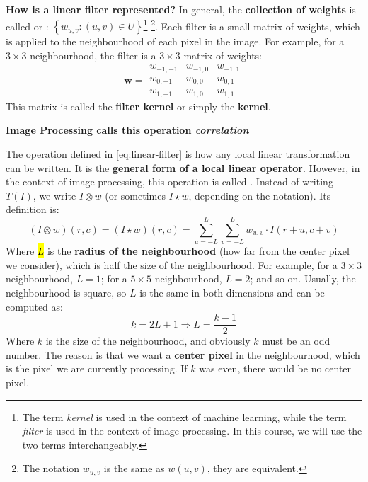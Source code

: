 \highspace
\textcolor{Green3}{ \textbf{How is a linear filter represented?}} In general, the \textbf{collection of weights} is called  or : $\left\{w_{u,v} : (u,v) \in U\right\}$\footnote{%
    The term \emph{kernel} is used in the context of machine learning, while the term \emph{filter} is used in the context of image processing. In this course, we will use the two terms interchangeably.
} \footnote{%
    The notation $w_{u,v}$ is the same as $w\left(u,v\right)$, they are equivalent.
}. Each filter is a small matrix of weights, which is applied to the neighbourhood of each pixel in the image. For example, for a $3 \times 3$ neighbourhood, the filter is a $3 \times 3$ matrix of weights:
\begin{equation*}
    \mathbf{w} = \begin{matrix}
        w_{-1,-1} & w_{-1,0} & w_{-1,1} \\
        w_{0,-1} & w_{0,0} & w_{0,1} \\
        w_{1,-1} & w_{1,0} & w_{1,1}
    \end{matrix}
\end{equation*}
This matrix is called the \textbf{filter kernel} or simply the \textbf{kernel}.

\highspace
\begin{flushleft}
    \textcolor{Green3}{ \textbf{Image Processing calls this operation \emph{correlation}}}
\end{flushleft}
The operation defined in \autoref{eq:linear-filter} is how any local linear transformation can be written. It is the \textbf{general form of a local linear operator}. However, in the context of image processing, this operation is called . Instead of writing $T\left(I\right)$, we write $I \otimes w$ (or sometimes $I \star w$, depending on the notation). Its definition is:
\begin{equation}\label{eq:correlation}
    \left(I \otimes w\right)\left(r,c\right) = \left(I \star w\right)\left(r,c\right) = \sum_{u=-L}^{L} \sum_{v=-L}^{L} w_{u,v} \cdot I\left(r+u, c+v\right)
\end{equation}
Where \hl{$L$} is the \textbf{radius of the neighbourhood} (how far from the center pixel we consider), which is half the size of the neighbourhood. For example, for a $3 \times 3$ neighbourhood, $L = 1$; for a $5 \times 5$ neighbourhood, $L = 2$; and so on. Usually, the neighbourhood is square, so $L$ is the same in both dimensions and can be computed as:
\begin{equation}
    k = 2L + 1 \Rightarrow L = \frac{k-1}{2}
\end{equation}
Where $k$ is the size of the neighbourhood, and obviously $k$ must be an odd number. The reason is that we want a \textbf{center pixel} in the neighbourhood, which is the pixel we are currently processing. If $k$ was even, there would be no center pixel.

